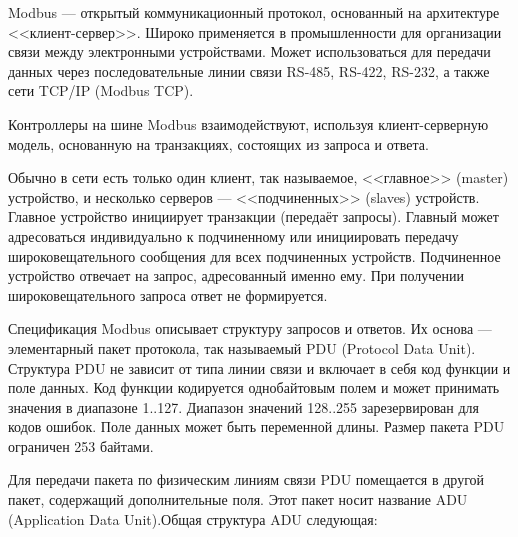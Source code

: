        Modbus — открытый коммуникационный протокол, основанный на архитектуре
        <<клиент-сервер>>. Широко применяется в промышленности для организации
        связи между электронными устройствами. Может использоваться для
        передачи данных через последовательные линии связи RS-485, RS-422,
        RS-232, а также сети TCP/IP (Modbus TCP).

        Контроллеры на шине Modbus взаимодействуют, используя клиент-серверную
        модель, основанную на транзакциях, состоящих из запроса и ответа.

        Обычно в сети есть только один клиент, так называемое, <<главное>> 
        (master) устройство, и несколько серверов — <<подчиненных>> (slaves)
        устройств. Главное устройство инициирует транзакции (передаёт запросы).
        Главный может адресоваться индивидуально к подчиненному или
        инициировать передачу широковещательного сообщения для всех подчиненных
        устройств. Подчиненное устройство отвечает на запрос, адресованный
        именно ему. При получении широковещательного запроса ответ не
        формируется.

        Спецификация Modbus описывает структуру запросов и ответов. Их основа —
        элементарный пакет протокола, так называемый PDU (Protocol Data Unit).
        Структура PDU не зависит от типа линии связи и включает в себя код
        функции и поле данных. Код функции кодируется однобайтовым полем и
        может принимать значения в диапазоне 1..127. Диапазон значений 128..255
        зарезервирован для кодов ошибок. Поле данных может быть переменной
        длины. Размер пакета PDU ограничен 253 байтами.

        Для передачи пакета по физическим линиям связи PDU помещается в другой
        пакет, содержащий дополнительные поля. Этот пакет носит название ADU
        (Application Data Unit).Общая структура ADU следующая:
        
